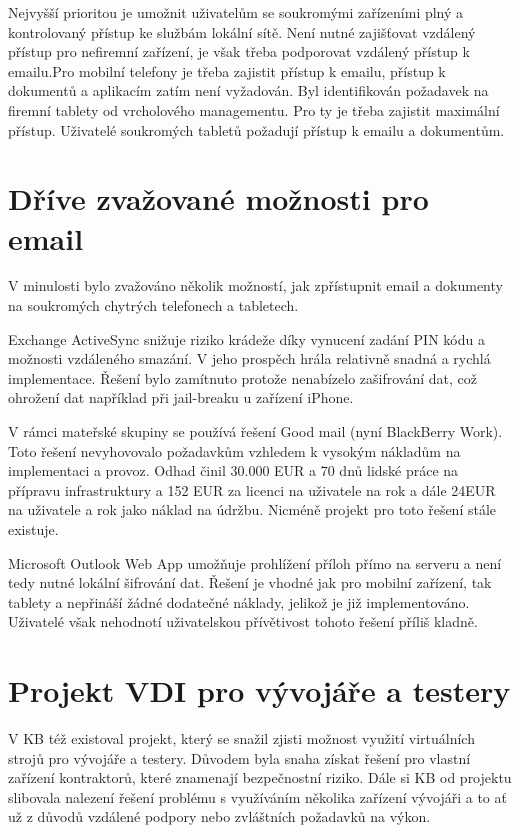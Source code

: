 Nejvyšší prioritou je umožnit uživatelům se soukromými zařízeními plný a kontrolovaný přístup ke službám lokální sítě. Není nutné zajišťovat vzdálený přístup pro nefiremní zařízení, je však třeba podporovat vzdálený přístup k emailu.Pro mobilní telefony je třeba zajistit přístup k emailu, přístup k dokumentů a aplikacím zatím není vyžadován. Byl identifikován požadavek na firemní tablety od vrcholového managementu. Pro ty je třeba zajistit maximální přístup. Uživatelé soukromých tabletů požadují přístup k emailu a dokumentům.

\section{Dříve zvažované možnosti pro email}
V minulosti bylo zvažováno několik možností, jak zpřístupnit email a dokumenty na soukromých chytrých telefonech a tabletech.

Exchange ActiveSync snižuje riziko krádeže díky vynucení zadání PIN kódu a možnosti vzdáleného smazání. V jeho prospěch hrála relativně snadná a rychlá implementace. Řešení bylo zamítnuto protože nenabízelo zašifrování dat, což ohrožení dat například při jail-breaku u zařízení iPhone.

V rámci mateřské skupiny se používá řešení Good mail (nyní BlackBerry Work). Toto řešení nevyhovovalo požadavkům vzhledem k vysokým nákladům na implementaci a provoz. Odhad činil 30.000 EUR a 70 dnů lidské práce na přípravu infrastruktury a 152 EUR za licenci na uživatele na rok a dále 24EUR na uživatele a rok jako náklad na údržbu. Nicméně projekt pro toto řešení stále existuje.

Microsoft Outlook Web App umožňuje prohlížení příloh přímo na serveru a není tedy nutné lokální šifrování dat. Řešení je vhodné jak pro mobilní zařízení, tak tablety a nepřináší žádné dodatečné náklady, jelikož je již implementováno. Uživatelé však nehodnotí uživatelskou přívětivost tohoto řešení příliš kladně.

\section{Projekt VDI pro vývojáře a testery}

V KB též existoval projekt, který se snažil zjisti možnost využití virtuálních strojů pro vývojáře a testery. Důvodem byla snaha získat řešení pro vlastní zařízení kontraktorů, které znamenají bezpečnostní riziko. Dále si KB od projektu slibovala nalezení řešení problému s využíváním několika zařízení vývojáři a to ať už z důvodů vzdálené podpory nebo zvláštních požadavků na výkon.

